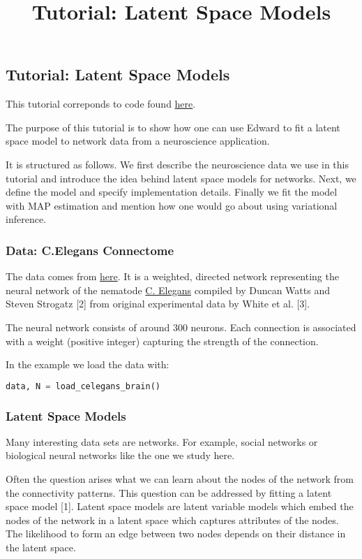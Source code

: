 \title{Tutorial: Latent Space Models}

\subsection{Tutorial: Latent Space Models}

This tutorial correponds to code found \href{https://github.com/blei-lab/edward/blob/master/examples/latent_space_model.py}{here}.

The purpose of this tutorial is to show how one can use Edward to fit a latent space model to network data from a neuroscience application.

It is structured as follows.
We first describe the neuroscience data we use in this tutorial and introduce the idea behind latent space models for networks.
Next, we define the model and specify implementation details. 
Finally we fit the model with MAP estimation and mention how one would go about using variational inference.

\subsubsection{Data: C.Elegans Connectome}

The data comes from \href{http://www-personal.umich.edu/~mejn/netdata/}{here}.
It is a weighted, directed network representing the neural network of the nematode \href{https://en.wikipedia.org/wiki/Caenorhabditis_elegans}{C. Elegans} compiled by Duncan Watts and Steven Strogatz [2] from original experimental data by White et al. [3]. 

The neural network consists of around $300$ neurons. Each connection is associated with a weight (positive integer) capturing the strength of the connection.

In the example we load the data with:
\begin{lstlisting}[language=Python]
data, N = load_celegans_brain()
\end{lstlisting}

\subsubsection{Latent Space Models}
Many interesting data sets are networks. For example, social networks or biological neural networks like the one we study here.

Often the question arises what we can learn about the nodes of the network from the connectivity patterns. This question can be addressed by fitting a latent space model [1].
Latent space models are latent variable models which embed the nodes of the network in a latent space which captures attributes of the nodes. The likelihood to form an edge between two nodes depends on their distance in the latent space.

